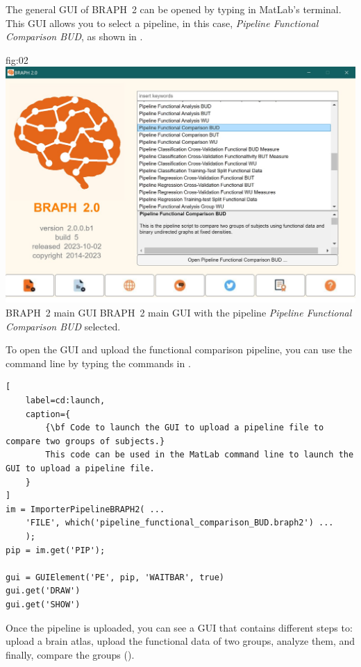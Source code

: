 \documentclass[justified]{tufte-handout}
\begin{document}
The general GUI of BRAPH~2 can be opened by typing  in MatLab's terminal. This GUI allows you to select a pipeline, in this case, \emph{Pipeline Functional Comparison BUD}, as shown in .

	{fig:02}
	{
	\includegraphics{fig02.jpg}
	}
	{BRAPH~2 main GUI}
	{
	BRAPH~2 main GUI with the pipeline \emph{Pipeline Functional Comparison BUD} selected.
	}


\begin{tcolorbox}[
	title=Pipeline launch from command line
]
To open the GUI and upload the functional comparison pipeline, you can use the command line by typing the commands in .

\begin{lstlisting}[
	label=cd:launch,
	caption={
		{\bf Code to launch the GUI to upload a pipeline file to compare two groups of subjects.}
		This code can be used in the MatLab command line to launch the GUI to upload a pipeline file.
	}
]
im = ImporterPipelineBRAPH2( ...
	'FILE', which('pipeline_functional_comparison_BUD.braph2') ...
	);
pip = im.get('PIP');

gui = GUIElement('PE', pip, 'WAITBAR', true)
gui.get('DRAW')
gui.get('SHOW')
\end{lstlisting}
\end{tcolorbox}

Once the pipeline is uploaded, you can see a GUI that contains different steps to: upload a brain atlas, upload the functional data of two groups, analyze them, and finally, compare the groups (). 
\end{document}
